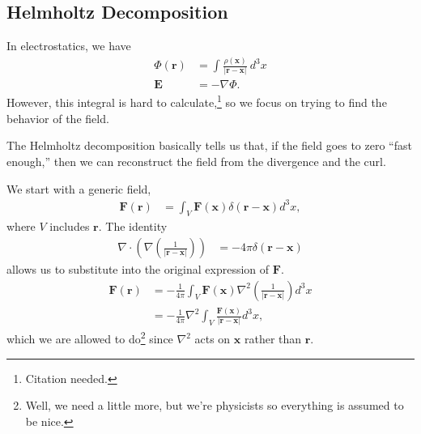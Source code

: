 \documentclass[10pt]{mypackage}
\begin{document}
\subsection{Helmholtz Decomposition}%
In electrostatics, we have
\begin{align*}
  \Phi\left(\mathbf{r}\right) &= \int_{}^{} \frac{\rho\left(\mathbf{x}\right)}{\left\vert\mathbf{r} - \mathbf{x}\right\vert}\:d^3x\\
  \mathbf{E} &= -\nabla\Phi.
\end{align*}
However, this integral is hard to calculate,\footnote{Citation needed.} so we focus on trying to find the behavior of the field.\newline

The Helmholtz decomposition basically tells us that, if the field goes to zero ``fast enough,'' then we can reconstruct the field from the divergence and the curl.\newline

We start with a generic field,
\begin{align*}
  \mathbf{F}\left(\mathbf{r}\right) &= \int_{V}\mathbf{F}\left(\mathbf{x}\right)\delta\left(\mathbf{r} - \mathbf{x}\right)d^3x,
\end{align*}
where $V$ includes $\mathbf{r}$. The identity
\begin{align*}
  \nabla\cdot \left(\nabla \left(\frac{1}{\left\vert \mathbf{r} - \mathbf{x} \right\vert}\right)\right) &= -4\pi \delta\left(\mathbf{r} - \mathbf{x}\right)
\end{align*}
allows us to substitute into the original expression of $\mathbf{F}$.
\begin{align*}
  \mathbf{F}\left(\mathbf{r}\right) &= -\frac{1}{4\pi}\int_{V}\mathbf{F}\left(\mathbf{x}\right)\nabla^2\left(\frac{1}{\left\vert \mathbf{r}-\mathbf{x} \right\vert}\right)d^3x\\
                                    &= -\frac{1}{4\pi}\nabla^2\int_{V}\frac{\mathbf{F}\left(\mathbf{x}\right)}{\left\vert \mathbf{r} - \mathbf{x} \right\vert}d^3x,
\end{align*}
which we are allowed to do\footnote{Well, we need a little more, but we're physicists so everything is assumed to be nice.} since $\nabla^2$ acts on $\mathbf{x}$ rather than $\mathbf{r}$.\newline
\end{document}
